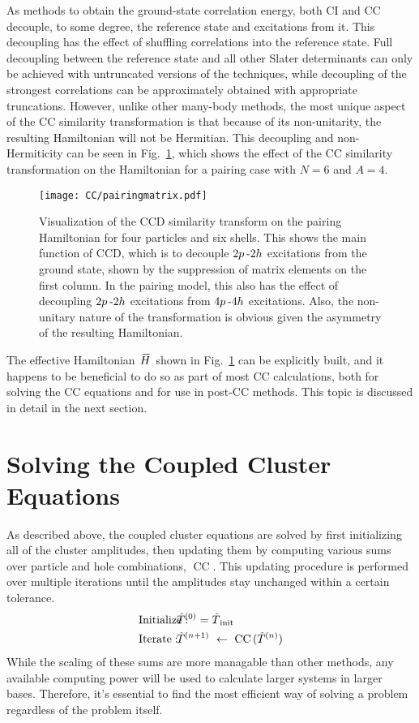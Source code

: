 \documentclass[thesis.tex]{subfiles}
\begin{document}
As methods to obtain the ground-state correlation energy, both CI and CC decouple, to some degree, the reference state and excitations from it.  This decoupling has the effect of shuffling correlations into the reference state.  Full decoupling between the reference state and all other Slater determinants can only be achieved with untruncated versions of the techniques, while decoupling of the strongest correlations can be approximately obtained with appropriate truncations.  However, unlike other many-body methods, the most unique aspect of the CC similarity transformation is that because of its non-unitarity, the resulting Hamiltonian will not be Hermitian.  This decoupling and non-Hermiticity can be seen in Fig.\ \ref{fig:pairingmatrix}, which shows the effect of the CC similarity transformation on the Hamiltonian for a pairing case with $N = 6$ and $A = 4$.
\begin{figure}[h]
  \centering
  \texttt{[image: CC/pairingmatrix.pdf]}
  \caption{Visualization of the CCD similarity transform on the pairing Hamiltonian for four particles and six shells.  This shows the main function of CCD, which is to decouple $2p\hspace{2pt}\text{-}2h$ excitations from the ground state, shown by the suppression of matrix elements on the first column. In the pairing model, this also has the effect of decoupling $2p\hspace{2pt}\text{-}2h$ excitations from $4p\hspace{2pt}\text{-}4h$ excitations.  Also, the non-unitary nature of the transformation is obvious given the asymmetry of the resulting Hamiltonian.}
  \label{fig:pairingmatrix}
\end{figure}
The effective Hamiltonian $\EHam$ shown in Fig.\ \ref{fig:pairingmatrix} can be explicitly built, and it happens to be beneficial to do so as part of most CC calculations, both for solving the CC equations and for use in post-CC methods.  This topic is discussed in detail in the next section.




\section{Solving the Coupled Cluster Equations} \label{section:solvingcc}

As described above, the coupled cluster equations are solved by first initializing all of the cluster amplitudes, then updating them by computing various sums over particle and hole combinations, $\text{CC}\mathop{(\Top)}$.  This updating procedure is performed over multiple iterations until the amplitudes stay unchanged within a certain tolerance.
\begin{align} \label{eq:cc_algorithm}
  &\text{Initialize}:&    \hspace{-20pt}&\Top^{\mathop{(0)}} = \Top_{\text{init}} \notag \\
  &\text{Iterate}:&       \hspace{-20pt}&\Top^{\mathop{(n+1)}}\ \leftarrow\ \text{CC}\mathop{(\Top^{\mathop{(n)}})}
\end{align}
While the scaling of these sums are more managable than other methods, any available computing power will be used to calculate larger systems in larger bases.  Therefore, it's essential to find the most efficient way of solving a problem regardless of the problem itself.
\end{document}
